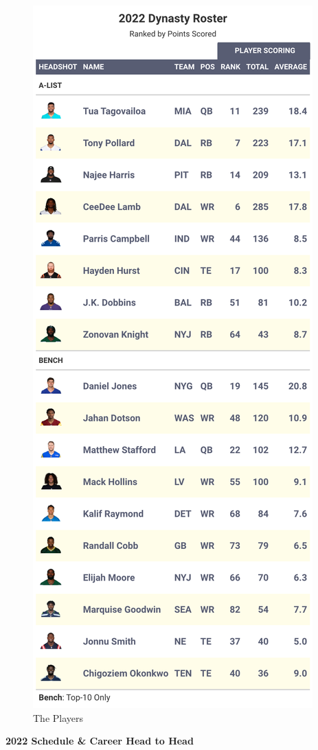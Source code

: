 \documentclass[
]{article}
\begin{document}
\begin{figure}
\includegraphics[width=0.75\linewidth,height=0.75\textheight]{output/2022/dynasty_roster_Asmontalvo} \caption{The Players}\label{fig:unnamed-chunk-12}
\end{figure}
\newpage

\textbf{2022 Schedule \& Career Head to Head}
\end{document}
